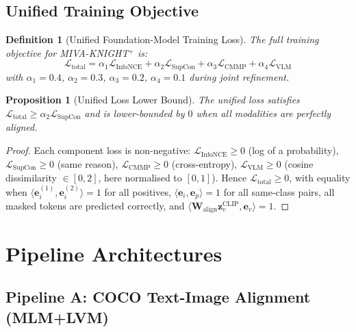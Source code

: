 \documentclass[10pt,conference]{IEEEtran}
\theoremstyle{ieeethm}
\newtheorem{proposition}[theorem]{Proposition}
\theoremstyle{ieeedef}
\newtheorem{definition}[theorem]{Definition}
\theoremstyle{ieeeremark}
\begin{document}
\subsection{Unified Training Objective}

\begin{definition}[Unified Foundation-Model Training Loss]
\label{def:unified_loss}
The full training objective for \textsc{MIVA-KNIGHT}$^+$ is:
\begin{equation}
\mathcal{L}_\text{total} = \alpha_1 \mathcal{L}_\text{InfoNCE} + \alpha_2 \mathcal{L}_\text{SupCon} + \alpha_3 \mathcal{L}_\text{CMMP} + \alpha_4 \mathcal{L}_\text{VLM}
\label{eq:total_loss}
\end{equation}
with $\alpha_1{=}0.4$, $\alpha_2{=}0.3$, $\alpha_3{=}0.2$, $\alpha_4{=}0.1$ during joint refinement.
\end{definition}

\begin{proposition}[Unified Loss Lower Bound]
\label{prop:lower_bound}
The unified loss satisfies $\mathcal{L}_\text{total} \geq \alpha_2 \mathcal{L}_\text{SupCon}$ and is lower-bounded by $0$ when all modalities are perfectly aligned.
\end{proposition}
\begin{proof}
Each component loss is non-negative: $\mathcal{L}_\text{InfoNCE} \geq 0$ (log of a probability), $\mathcal{L}_\text{SupCon} \geq 0$ (same reason), $\mathcal{L}_\text{CMMP} \geq 0$ (cross-entropy), $\mathcal{L}_\text{VLM} \geq 0$ (cosine dissimilarity $\in [0,2]$, here normalised to $[0,1]$). Hence $\mathcal{L}_\text{total} \geq 0$, with equality when $\langle\mathbf{e}^{(1)}_i, \mathbf{e}^{(2)}_i\rangle = 1$ for all positives, $\langle\mathbf{e}_i, \mathbf{e}_p\rangle = 1$ for all same-class pairs, all masked tokens are predicted correctly, and $\langle\mathbf{W}_\text{align}\mathbf{z}_v^\text{CLIP}, \mathbf{e}_v\rangle = 1$.
\end{proof}

\section{Pipeline Architectures}
\label{sec:pipelines}

\subsection{Pipeline A: COCO Text-Image Alignment (MLM+LVM)}
\end{document}
